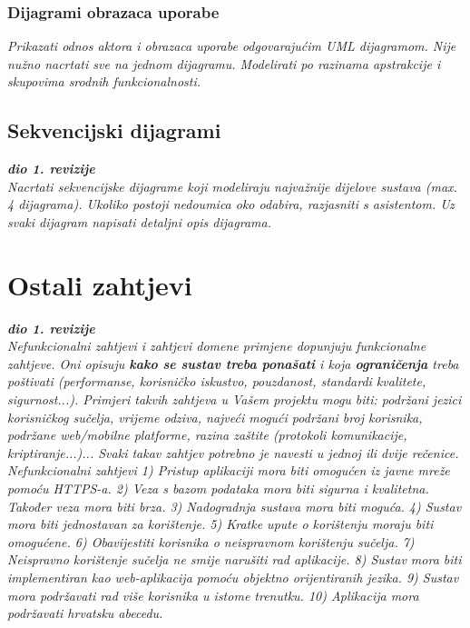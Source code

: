 					
				\subsubsection{Dijagrami obrazaca uporabe}
					
					\textit{Prikazati odnos aktora i obrazaca uporabe odgovarajućim UML dijagramom. Nije nužno nacrtati sve na jednom dijagramu. Modelirati po razinama apstrakcije i skupovima srodnih funkcionalnosti.}
				\eject		
				
			\subsection{Sekvencijski dijagrami}
				
				\textbf{\textit{dio 1. revizije}}\\
				
				\textit{Nacrtati sekvencijske dijagrame koji modeliraju najvažnije dijelove sustava (max. 4 dijagrama). Ukoliko postoji nedoumica oko odabira, razjasniti s asistentom. Uz svaki dijagram napisati detaljni opis dijagrama.}
				\eject
	
		\section{Ostali zahtjevi}
		
			\textbf{\textit{dio 1. revizije}}\\
		 
			 \textit{Nefunkcionalni zahtjevi i zahtjevi domene primjene dopunjuju funkcionalne zahtjeve. Oni opisuju \textbf{kako se sustav treba ponašati} i koja \textbf{ograničenja} treba poštivati (performanse, korisničko iskustvo, pouzdanost, standardi kvalitete, sigurnost...). Primjeri takvih zahtjeva u Vašem projektu mogu biti: podržani jezici korisničkog sučelja, vrijeme odziva, najveći mogući podržani broj korisnika, podržane web/mobilne platforme, razina zaštite (protokoli komunikacije, kriptiranje...)... Svaki takav zahtjev potrebno je navesti u jednoj ili dvije rečenice.
			 Nefunkcionalni zahtjevi
			 1) Pristup aplikaciji mora biti omogućen iz javne mreže pomoću HTTPS-a.
			 2) Veza s bazom podataka mora biti sigurna i kvalitetna. Također veza mora biti brza.
			 3) Nadogradnja sustava mora biti moguća.
			 4) Sustav mora biti jednostavan za korištenje.
			 5) Kratke upute o korištenju moraju biti omogućene.
			 6) Obavijestiti korisnika o neispravnom korištenju sučelja.
			 7) Neispravno korištenje sučelja ne smije narušiti rad aplikacije.
			 8) Sustav mora biti implementiran kao web-aplikacija pomoću objektno orijentiranih jezika.
			 9) Sustav mora podržavati rad više korisnika u istome trenutku.
			 10) Aplikacija mora podržavati hrvatsku abecedu.}\\
			 
			 
			 
	